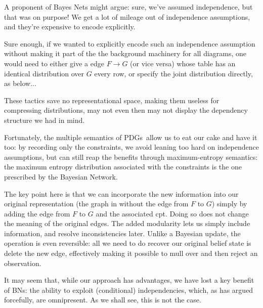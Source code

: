 \documentclass{article}
\newcommand{\MN}{PDG}
\newcommand{\MNs}{\MN s}
\numberwithin{equation}{section}
\begin{document}
\begin{example}
\begin{vfull}
{			A proponent of Bayes Nets might argue: sure, we've assumed independence, but that was on purpose! We get a lot of mileage out of independence assumptions, and they're expensive to encode explicitly.
			
			Sure enough, if we wanted to explicitly encode such an independence assumption without making it part of the the background machinery for all diagrams, one would need to either give a edge $F \to G$ (or vice versa) whose table has an identical distribution over $G$ every row, or specify the joint distribution directly, as below...
			
			\centerline{}
		
			These tactics save no representational space, making them useless for compressing distributions, may not even then may not display the dependency structure we had in mind. 
			
			Fortunately, the multiple semantics of \MNs\ allow us to eat our cake and have it too: by recording only the constraints, we avoid leaning too hard on independence assumptions, but can still reap the benefits through maximum-entropy semantics: the maximum entropy distribution associated with the constraints is the one prescribed by the Bayesian Network.
		}
		\end{vfull}
	
		The key point here is that we can incorporate the new information into
		our original representation (the graph in 
		without the edge from $F$ to $G$) simply  by adding the edge from $F$
		to $G$ and the associated cpt.  Doing so does not change the meaning
		of the original edges.  The added modularity lets us simply include
		information, and resolve inconsistencies later. Unlike a Bayesian
		update, the operation is even reversible: all we need to do recover
		our original belief state is delete the new edge, effectively making
		it possible to mull over and then reject an observation.
	\end{example}

	It may seem that, while our approach has advantages, we have lost a
	key benefit of BNs: the ability to exploit (conditional)
	independencies, which, as \textcite{pearl2014probabilistic} has argued
	forcefully, are omnipresent.  As we shall see, this is not the case.  
	
\end{document}
